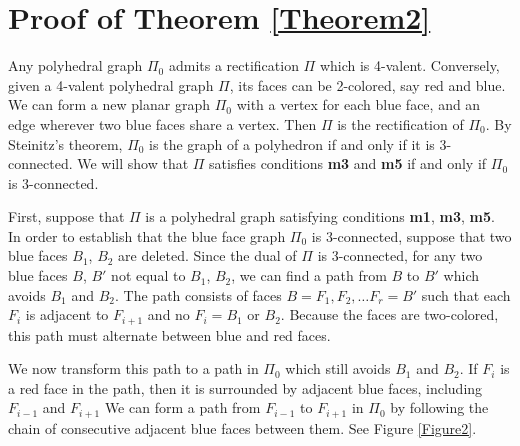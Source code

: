 \documentclass[11pt,letterpaper]{amsart}
\begin{document}
\section{Proof of Theorem \ref{Theorem2}}

Any polyhedral graph $\Pi_0$ admits a rectification $\Pi$ which is 4-valent. Conversely, given a 4-valent polyhedral graph $\Pi$, its faces can be 2-colored, say red and blue. We can form a new planar graph $\Pi_0$ with a vertex for each blue face, and an edge wherever two blue faces share a vertex. Then $\Pi$ is the rectification of $\Pi_0$. By Steinitz's theorem, $\Pi_0$ is the graph of a polyhedron if and only if it is 3-connected. We will show that $\Pi$ satisfies conditions \textbf{m3} and \textbf{m5} if and only if $\Pi_0$ is 3-connected. 

First, suppose that $\Pi$ is a polyhedral graph satisfying conditions \textbf{m1}, \textbf{m3}, \textbf{m5}. In order to establish that the blue face graph $\Pi_0$ is 3-connected, suppose that two blue faces $B_1$, $B_2$ are deleted. Since the dual of $\Pi$ is 3-connected, for any two blue faces $B$, $B'$ not equal to $B_1$, $B_2$, we can find a path from $B$ to $B'$ which avoids $B_1$ and $B_2$. The path consists of faces $B=F_1, F_2, \ldots F_r=B'$ such that each $F_i$ is adjacent to $F_{i+1}$ and no $F_i=B_1$ or $B_2$. Because the faces are two-colored, this path must alternate between blue and red faces. 

We now transform this path to a path in $\Pi_0$ which still avoids $B_1$ and $B_2$. If $F_i$ is a red face in the path, then it is surrounded by adjacent blue faces, including $F_{i-1}$ and $F_{i+1}$ We can form a path from $F_{i-1}$ to $F_{i+1}$ in $\Pi_0$ by following the chain of consecutive adjacent blue faces between them. See Figure \ref{Figure2}.
\end{document}
